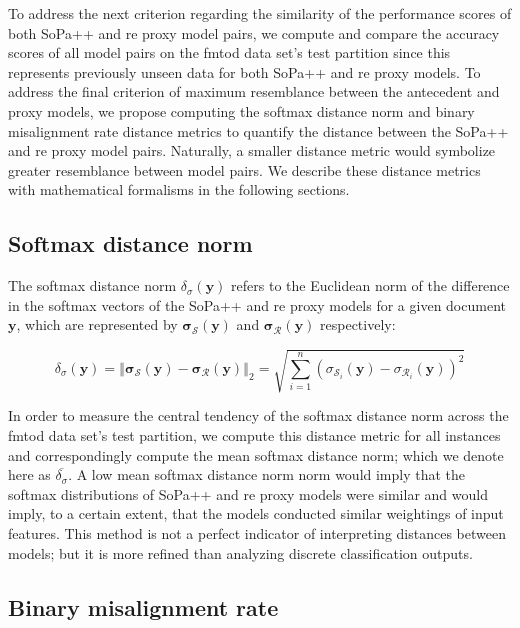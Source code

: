 To address the next criterion regarding the similarity of the performance scores
of both SoPa++ and \ac{re} proxy model pairs, we compute and compare the accuracy
scores of all model pairs on the \ac{fmtod} data set's test partition since this
represents previously unseen data for both SoPa++ and \ac{re} proxy models. To
address the final criterion of maximum resemblance between the antecedent and
proxy models, we propose computing the softmax distance norm and binary
misalignment rate distance metrics to quantify the distance between the SoPa++
and \ac{re} proxy model pairs. Naturally, a smaller distance metric would symbolize
greater resemblance between model pairs. We describe these distance metrics with
mathematical formalisms in the following sections.

\subsection{Softmax distance norm}

The softmax distance norm $\delta_{\sigma}(\bm{y})$ refers to the Euclidean norm
of the difference in the softmax vectors of the SoPa++ and \ac{re} proxy models for a
given document $\bm{y}$, which are represented by
$\bm{\sigma_{\mathcal{S}}}(\bm{y})$ and $\bm{\sigma_{\mathcal{R}}}(\bm{y})$
respectively:

\begin{equation}
  \delta_{\sigma}(\bm{y}) = \left\Vert \bm{\sigma_{\mathcal{S}}}(\bm{y}) - \bm{\sigma_{\mathcal{R}}}(\bm{y}) \right\Vert_{2} = \sqrt{\sum^n_{i=1} (\sigma_{\mathcal{S}_i}(\bm{y}) - \sigma_{\mathcal{R}_i}(\bm{y}))^2} 
\end{equation}

In order to measure the central tendency of the softmax distance norm across the
\ac{fmtod} data set's test partition, we compute this distance metric for all
instances and correspondingly compute the mean softmax distance norm; which we
denote here as $\overline{\delta_{\sigma}}$. A low mean softmax distance norm
norm would imply that the softmax distributions of SoPa++ and \ac{re} proxy models
were similar and would imply, to a certain extent, that the models conducted
similar weightings of input features. This method is not a perfect indicator of
interpreting distances between models; but it is more refined than analyzing
discrete classification outputs.

\subsection{Binary misalignment rate}

